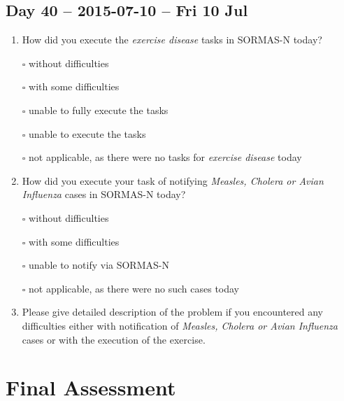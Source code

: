 \documentclass[a4paper, titlepage]{tufte-handout}
\begin{document}
\subsection{Day 40 -- 2015-07-10 -- Fri 10 Jul}
\label{sec-8-30}
\begin{enumerate}
\item How did you execute the \emph{exercise disease} tasks in SORMAS-N today?

\quad $\square$ without difficulties

\quad $\square$ with some difficulties

\quad $\square$ unable to fully execute the tasks

\quad $\square$ unable to execute the tasks

\quad $\square$ not applicable, as there were no tasks for \emph{exercise disease} today

\item How did you execute your task of notifying \emph{Measles, Cholera or Avian Influenza} cases in SORMAS-N today?

\quad $\square$ without difficulties

\quad $\square$ with some difficulties

\quad $\square$ unable to notify via SORMAS-N

\quad $\square$ not applicable, as there were no such cases today

\item Please give detailed description of the problem if you encountered any difficulties either with notification of \emph{Measles, Cholera or Avian Influenza} cases or with the execution of the exercise.

\hrulefill

\hrulefill

\hrulefill

\hrulefill

\hrulefill

\hrulefill

\hrulefill

\hrulefill

\hrulefill

\hrulefill
\end{enumerate}





\newpage
\section{Final Assessment}
\label{sec-9}
\end{document}
